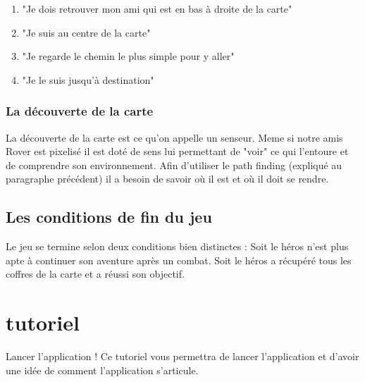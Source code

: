\documentclass[a4paper 12pts]{article}
\begin{document}
\vspace{0.5cm}

\begin{enumerate}
\item "Je dois retrouver mon ami qui est en bas à droite de la carte"
\item "Je suis au centre de la carte"
\item "Je regarde le chemin le plus simple pour y aller"
\item "Je le suis jusqu'à destination"
\end{enumerate}

\vspace{0.75cm}

\subsubsection{La découverte de la carte}

\vspace{0.75cm}

La découverte de la carte est ce qu'on appelle un senseur.
Meme si notre amis Rover est pixelisé il est doté de sens lui permettant de "voir" ce qui l'entoure et de comprendre son environnement.
Afin d'utiliser le path finding (expliqué au paragraphe précédent) il a besoin de savoir où il est et où il doit se rendre.

\vspace{0.75cm}

\subsection{Les conditions de fin du jeu}

\vspace{0.75cm}

Le jeu se termine selon deux conditions bien distinctes :
Soit le héros n'est plus apte à continuer son aventure après un combat.
Soit le héros a récupéré tous les coffres de la carte et a réussi son objectif.

\newpage

\section{tutoriel}
\vspace{0.55cm}

Lancer l'application !
Ce tutoriel vous permettra de lancer l'application et d'avoir une idée de comment l'application s'articule.
\end{document}
